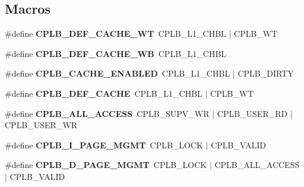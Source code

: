 \subsection*{Macros}
\begin{DoxyCompactItemize}
\item 
\mbox{\label{group__ezkit533__cplb_ga9b0439d011a5e1b22252426dc7e65b8e}} 
\#define {\bfseries C\+P\+L\+B\+\_\+\+D\+E\+F\+\_\+\+C\+A\+C\+H\+E\+\_\+\+WT}~C\+P\+L\+B\+\_\+\+L1\+\_\+\+C\+H\+BL $\vert$ C\+P\+L\+B\+\_\+\+WT
\item 
\mbox{\label{group__ezkit533__cplb_ga757daa324769dc29e8052e389e3bb9f2}} 
\#define {\bfseries C\+P\+L\+B\+\_\+\+D\+E\+F\+\_\+\+C\+A\+C\+H\+E\+\_\+\+WB}~C\+P\+L\+B\+\_\+\+L1\+\_\+\+C\+H\+BL
\item 
\mbox{\label{group__ezkit533__cplb_gacd77bd9a34a37c987bfd89fa4f9e3c22}} 
\#define {\bfseries C\+P\+L\+B\+\_\+\+C\+A\+C\+H\+E\+\_\+\+E\+N\+A\+B\+L\+ED}~C\+P\+L\+B\+\_\+\+L1\+\_\+\+C\+H\+BL $\vert$ C\+P\+L\+B\+\_\+\+D\+I\+R\+TY
\item 
\mbox{\label{group__ezkit533__cplb_gaf669ac4d569e54d709e7a875587cc36e}} 
\#define {\bfseries C\+P\+L\+B\+\_\+\+D\+E\+F\+\_\+\+C\+A\+C\+HE}~C\+P\+L\+B\+\_\+\+L1\+\_\+\+C\+H\+BL $\vert$ C\+P\+L\+B\+\_\+\+WT
\item 
\mbox{\label{group__ezkit533__cplb_ga3b0a7f17f5ffda4e86b07816ff399649}} 
\#define {\bfseries C\+P\+L\+B\+\_\+\+A\+L\+L\+\_\+\+A\+C\+C\+E\+SS}~C\+P\+L\+B\+\_\+\+S\+U\+P\+V\+\_\+\+WR $\vert$ C\+P\+L\+B\+\_\+\+U\+S\+E\+R\+\_\+\+RD $\vert$ C\+P\+L\+B\+\_\+\+U\+S\+E\+R\+\_\+\+WR
\item 
\mbox{\label{group__ezkit533__cplb_ga74715cacb2d597302ee1cd51d927967a}} 
\#define {\bfseries C\+P\+L\+B\+\_\+\+I\+\_\+\+P\+A\+G\+E\+\_\+\+M\+G\+MT}~C\+P\+L\+B\+\_\+\+L\+O\+CK $\vert$ C\+P\+L\+B\+\_\+\+V\+A\+L\+ID
\item 
\mbox{\label{group__ezkit533__cplb_gaeef3582727448ecf86e3e019d7caaaf1}} 
\#define {\bfseries C\+P\+L\+B\+\_\+\+D\+\_\+\+P\+A\+G\+E\+\_\+\+M\+G\+MT}~C\+P\+L\+B\+\_\+\+L\+O\+CK $\vert$ C\+P\+L\+B\+\_\+\+A\+L\+L\+\_\+\+A\+C\+C\+E\+SS $\vert$ C\+P\+L\+B\+\_\+\+V\+A\+L\+ID

\end{DoxyCompactItemize}
